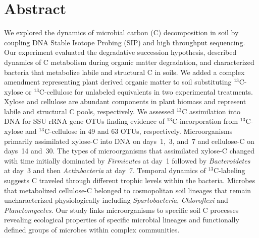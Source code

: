 \section{Abstract} We explored the dynamics of microbial carbon (C)
decomposition in soil by coupling DNA Stable Isotope Probing (SIP) and high
throughput sequencing. Our experiment evaluated the degradative succession
hypothesis, described dynamics of C metabolism during organic matter
degradation, and characterized bacteria that metabolize labile and
structural C in soils. We added a complex amendment representing plant
derived organic matter to soil substituting $^{13}$C-xylose
or $^{13}$C-cellulose for unlabeled equivalents in two experimental
treatments. Xylose and cellulose are abundant components in plant biomass
and represent labile and structural C pools, respectively. We assessed
$^{13}$C assimilation into DNA for SSU rRNA gene OTUs finding evidence of
$^{13}$C-incorporation from $^{13}$C-xylose and $^{13}$C-cellulose in 49
and 63 OTUs, respectively. Microorganisms primarily assimilated xylose-C
into DNA on days~1,~3, and~7 and cellulose-C on days~14 and~30. The types
of microorganisms that assimilated xylose-C changed with time initially
dominated by \textit{Firmicutes} at day~1 followed by
\textit{Bacteroidetes} at day~3 and then \textit{Actinbacteria} at day~7.
Temporal dynamics of $^{13}$C-labeling suggests C traveled through different
trophic levels within the bacteria. Microbes that metabolized
cellulose-C belonged to cosmopolitan soil lineages that remain uncharacterized
physiologically including \textit{Spartobacteria}, \textit{Chloroflexi} and
\textit{Planctomycetes}. Our study links microorganisms to specific soil
C processes revealing ecological properties of specific microbial lineages and
functionally defined groups of microbes within complex communities.
